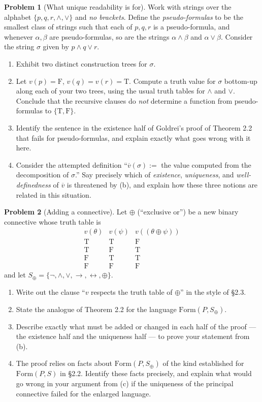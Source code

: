 \documentclass[11pt]{article}
\newcommand{\Form}{\mathrm{Form}}
\newcommand{\T}{\mathrm{T}}
\newcommand{\F}{\mathrm{F}}
\newcommand{\TF}{\{\T,\F\}}
\newcommand{\ext}[1]{\overline{#1}}
\theoremstyle{definition}
\newtheorem{problem}{Problem}
\begin{document}
\begin{problem}[What unique readability is for]
Work with strings over the alphabet $\{p,q,r,\land,\lor\}$ and \emph{no brackets}.
Define the \emph{pseudo-formulas} to be the smallest class of strings such that
each of $p,q,r$ is a pseudo-formula, and whenever $\alpha,\beta$ are
pseudo-formulas, so are the strings $\alpha\land\beta$ and $\alpha\lor\beta$.
Consider the string $\sigma$ given by $p\land q\lor r$.
\begin{enumerate}
\item[(a)] Exhibit two distinct construction trees for $\sigma$.
\item[(b)] Let $v(p)=\F$, $v(q)=v(r)=\T$. Compute a truth value for $\sigma$
bottom-up along each of your two trees, using the usual truth tables for $\land$
and $\lor$. Conclude that the recursive clauses do \emph{not} determine a function
from pseudo-formulas to $\TF$.
\item[(c)] Identify the sentence in the existence half of Goldrei's proof of
Theorem 2.2 that fails for pseudo-formulas, and explain exactly what goes wrong
with it here.
\item[(d)] Consider the attempted definition ``$\ext{v}(\sigma) :=$ the value
computed from the decomposition of $\sigma$.'' Say precisely which of
\emph{existence}, \emph{uniqueness}, and \emph{well-definedness} of $\ext{v}$ is
threatened by (b), and explain how these three notions are related in this
situation.
\end{enumerate}
\end{problem}

\begin{problem}[Adding a connective]
Let $\oplus$ (``exclusive or'') be a new binary connective whose truth table is
\[
\begin{array}{cc|c}
v(\theta) & v(\psi) & v((\theta\oplus\psi))\\ \hline
\T & \T & \F\\
\T & \F & \T\\
\F & \T & \T\\
\F & \F & \F
\end{array}
\]
and let $S_{\oplus}=\{\lnot,\land,\lor,\to,\leftrightarrow,\oplus\}$.
\begin{enumerate}
\item[(a)] Write out the clause ``$v$ respects the truth table of $\oplus$'' in
the style of \S 2.3.
\item[(b)] State the analogue of Theorem 2.2 for the language
$\Form(P,S_{\oplus})$.
\item[(c)] Describe exactly what must be added or changed in each half of the
proof --- the existence half and the uniqueness half --- to prove your statement
from (b).
\item[(d)] The proof relies on facts about $\Form(P,S_{\oplus})$ of the kind
established for $\Form(P,S)$ in \S 2.2. Identify these facts precisely, and
explain what would go wrong in your argument from (c) if the uniqueness of the
principal connective failed for the enlarged language.
\end{enumerate}
\end{problem}
\end{document}
